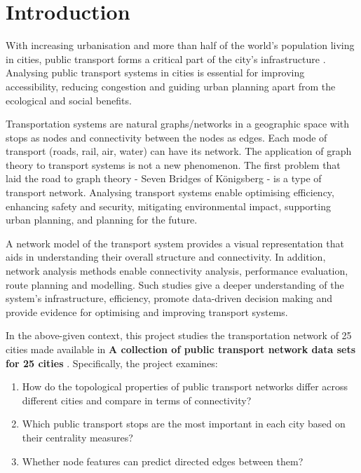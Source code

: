 \documentclass{article}
\theoremstyle{plain}
\theoremstyle{definition}
\theoremstyle{remark}
\begin{document}
\section{Introduction}
\label{introduction}

With increasing urbanisation and more than half of the world's population living in cities, public transport forms a critical part of the city's infrastructure \cite{World_Bank_cities_2023}. Analysing public transport systems in cities is essential for improving accessibility, reducing congestion and guiding urban planning apart from the ecological and social benefits.

Transportation systems are natural graphs/networks in a geographic space with stops as nodes and connectivity between the nodes as edges. Each mode of transport (roads, rail, air, water) can have its network. The application of graph theory to transport systems is not a new phenomenon. The first problem that laid the road to graph theory \cite{Barabási_2016} - Seven Bridges of Königsberg - is a type of transport network. Analysing transport systems enable optimising efficiency, enhancing safety and security, mitigating environmental impact, supporting urban planning, and planning for the future.

A network model of the transport system provides a visual representation that aids in understanding their overall structure and connectivity. In addition, network analysis methods enable connectivity analysis, performance evaluation, route planning and modelling. Such studies give a deeper understanding of the system's infrastructure, efficiency, promote data-driven decision making and provide evidence for optimising and improving transport systems.

In the above-given context, this project studies the transportation network of 25 cities made available in \textbf{A collection of public transport network data sets for 25 cities} \cite{rainer_kujala_2018_1186215}. Specifically, the project examines:

\begin{enumerate}
    \item How do the topological properties of public transport networks differ across different cities and compare in terms of connectivity?
    \item Which public transport stops are the most important in each city based on their centrality measures?
    \item Whether node features can predict directed edges between them?
\end{enumerate}
\end{document}
